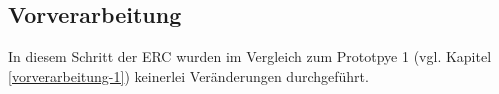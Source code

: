 \subsection{Vorverarbeitung} \label{vorverarbeitung-4}

In diesem Schritt der ERC wurden im Vergleich zum Prototpye 1 (vgl. Kapitel \ref{vorverarbeitung-1}) keinerlei Ver{\"a}nderungen durchgef{\"u}hrt. \\